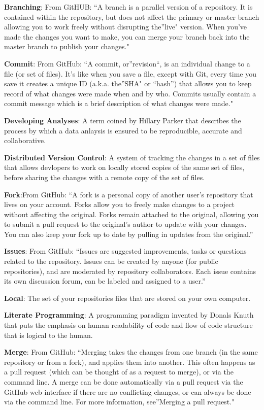 \documentclass[]{book}
\begin{document}
\textbf{Branching}: From GitHUB: ``A branch is a parallel version of a
repository. It is contained within the repository, but does not affect
the primary or master branch allowing you to work freely without
disrupting the''live" version. When you've made the changes you want to
make, you can merge your branch back into the master branch to publish
your changes."

\textbf{Commit}: From GitHub: ``A commit, or''revision``, is an
individual change to a file (or set of files). It's like when you save a
file, except with Git, every time you save it creates a unique ID
(a.k.a. the''SHA" or ``hash'') that allows you to keep record of what
changes were made when and by who. Commits usually contain a commit
message which is a brief description of what changes were made."

\textbf{Developing Analyses}: A term coined by Hillary Parker that
describes the process by which a data anlaysis is ensured to be
reproducible, accurate and collaborative.

\textbf{Distributed Version Control}: A system of tracking the changes
in a set of files that allows devlopers to work on locally stored copies
of the same set of files, before sharing the changes with a remote copy
of the set of files.

\textbf{Fork}:From GitHub: ``A fork is a personal copy of another user's
repository that lives on your account. Forks allow you to freely make
changes to a project without affecting the original. Forks remain
attached to the original, allowing you to submit a pull request to the
original's author to update with your changes. You can also keep your
fork up to date by pulling in updates from the original.''

\textbf{Issues}: From GitHub: ``Issues are suggested improvements, tasks
or questions related to the repository. Issues can be created by anyone
(for public repositories), and are moderated by repository
collaborators. Each issue contains its own discussion forum, can be
labeled and assigned to a user.''

\textbf{Local}: The set of your repositories files that are stored on
your own computer.

\textbf{Literate Programming}: A programming paradigm invented by Donals
Knuth that puts the emphasis on human readability of code and flow of
code structure that is logical to the human.

\textbf{Merge}: From GitHub: ``Merging takes the changes from one branch
(in the same repository or from a fork), and applies them into another.
This often happens as a pull request (which can be thought of as a
request to merge), or via the command line. A merge can be done
automatically via a pull request via the GitHub web interface if there
are no conflicting changes, or can always be done via the command line.
For more information, see''Merging a pull request."
\end{document}
